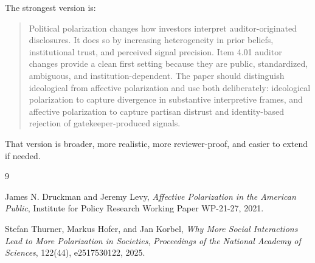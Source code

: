 \documentclass[12pt]{article}
\begin{document}
The strongest version is:

\begin{quote}
Political polarization changes how investors interpret auditor-originated disclosures. It does so by increasing heterogeneity in prior beliefs, institutional trust, and perceived signal precision. Item 4.01 auditor changes provide a clean first setting because they are public, standardized, ambiguous, and institution-dependent. The paper should distinguish ideological from affective polarization and use both deliberately: ideological polarization to capture divergence in substantive interpretive frames, and affective polarization to capture partisan distrust and identity-based rejection of gatekeeper-produced signals.
\end{quote}

That version is broader, more realistic, more reviewer-proof, and easier to extend if needed.

\begin{thebibliography}{9}

James N. Druckman and Jeremy Levy,
\textit{Affective Polarization in the American Public},
Institute for Policy Research Working Paper WP-21-27, 2021.

Stefan Thurner, Markus Hofer, and Jan Korbel,
\textit{Why More Social Interactions Lead to More Polarization in Societies},
\textit{Proceedings of the National Academy of Sciences}, 122(44), e2517530122, 2025.

\end{thebibliography}
\end{document}
